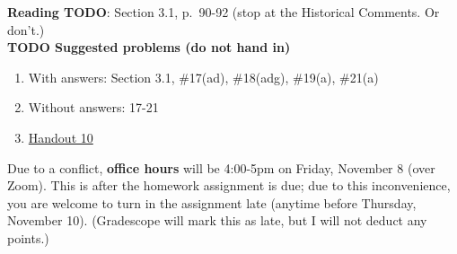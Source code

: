 \documentclass[12pt]{article}
\begin{document}
\noindent \textbf{Reading TODO}: Section 3.1, p.~90-92 (stop at the Historical Comments. Or don't.)
\\



\noindent \textbf{TODO Suggested problems (do not hand in)}

\begin{enumerate}
\item With answers: Section 3.1, \#17(ad), \#18(adg), \#19(a), \#21(a)
\item Without answers: 17-21
\item \href{https://www.math.emory.edu/~dzb/teaching/250Fall2021/handouts/250-H10-preimages.pdf}{Handout 10}
\end{enumerate}

\noindent Due to a conflict, \textbf{office hours} will be 4:00-5pm on Friday, November 8 (over Zoom). This is after the homework assignment is due; due to this inconvenience, you are welcome to turn in the assignment late (anytime before Thursday, November 10). (Gradescope will mark this as late, but I will not deduct any points.) 
\\
\end{document}
